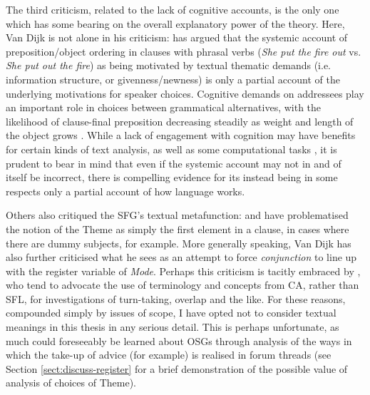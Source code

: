 The third criticism, related to the lack of cognitive accounts, is the only one which has some bearing on the overall explanatory power of the theory. Here, Van Dijk is not alone in his criticism: \textcite{rohdenburg_cognitive_1996} has argued that the systemic account of preposition\slash object ordering in clauses with phrasal verbs (\emph{She put the fire out} vs. \emph{She put out the fire}) as being motivated by textual thematic demands (i.e. information structure, or givenness\slash newness) is only a partial account of the underlying motivations for speaker choices. Cognitive demands on addressees play an important role in choices between grammatical alternatives, with the likelihood of clause\hyp{}final preposition decreasing steadily as weight and length of the object grows \cite[c.f.][]{hawkins1992syntactic}. While a lack of engagement with cognition may have benefits for certain kinds of text analysis, as well as some computational tasks \cite{odonnell_[sys-func]_2014}, it is prudent to bear in mind that even if the systemic account may not in and of itself be incorrect, there is compelling evidence for its instead being in some respects only a partial account of how language works.

Others also critiqued the \gls{SFG}'s textual metafunction: \textcite{huddleston_constituency_1988} and \textcite{widdowson_text_2008} have problematised the notion of the \gls{Theme} as simply the first element in a clause, in cases where there are dummy subjects, for example. More generally speaking, Van Dijk has also further criticised what he sees as an attempt to force  \emph{conjunction} to line up with the register variable of \emph{Mode}. Perhaps this criticism is tacitly embraced by \textcite{eggins_analysing_2004}, who tend to advocate the use of terminology and concepts from \gls{CA}, rather than \gls{SFL}, for investigations of turn\hyp{}taking, overlap and the like. For these reasons, compounded simply by issues of scope, I have opted not to consider textual meanings in this thesis in any serious detail. This is perhaps unfortunate, as much could foreseeably be learned about \glspl{OSG} through analysis of the ways in which the take\hyp{}up of advice (for example) is realised in \gls{forum} \glspl{thread} (see Section \ref{sect:discuss-register} for a brief demonstration of the possible value of analysis of choices of Theme).




